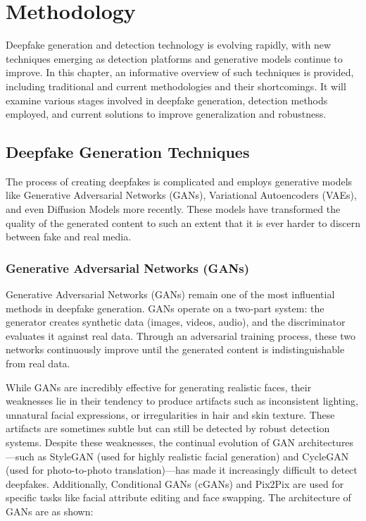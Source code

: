 \documentclass[lettersize,journal]{IEEEtran}
\begin{document}
\section{Methodology}
\noindent Deepfake generation and detection technology is evolving rapidly, with new techniques emerging as detection platforms and generative models continue to improve. In this chapter, an informative overview of such techniques is provided, including traditional and current methodologies and their shortcomings. It will examine various stages involved in deepfake generation, detection methods employed, and current solutions to improve generalization and robustness.

\subsection{Deepfake Generation Techniques}
The process of creating deepfakes is complicated and employs generative models like Generative Adversarial Networks (GANs), Variational Autoencoders (VAEs), and even Diffusion Models more recently. These models have transformed the quality of the generated content to such an extent that it is ever harder to discern between fake and real media.\cite{article}

\subsubsection{Generative Adversarial Networks (GANs)}

Generative Adversarial Networks (GANs) remain one of the most influential methods in deepfake generation. GANs operate on a two-part system: the generator creates synthetic data (images, videos, audio), and the discriminator evaluates it against real data. Through an adversarial training process, these two networks continuously improve until the generated content is indistinguishable from real data.

While GANs are incredibly effective for generating realistic faces, their weaknesses lie in their tendency to produce artifacts such as inconsistent lighting, unnatural facial expressions, or irregularities in hair and skin texture. These artifacts are sometimes subtle but can still be detected by robust detection systems. Despite these weaknesses, the continual evolution of GAN architectures—such as StyleGAN (used for highly realistic facial generation) and CycleGAN (used for photo-to-photo translation)—has made it increasingly difficult to detect deepfakes. Additionally, Conditional GANs (cGANs) and Pix2Pix are used for specific tasks like facial attribute editing and face swapping. The architecture of GANs are as shown:
\end{document}
